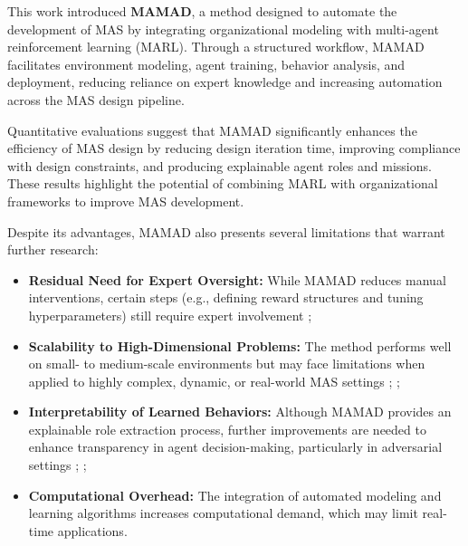 \documentclass[pdflatex,sn-mathphys-num]{sn-jnl}%
\theoremstyle{thmstyleone}%
\theoremstyle{thmstyletwo}%
\theoremstyle{thmstylethree}%
\begin{document}
This work introduced \textbf{MAMAD}, a method designed to automate the development of MAS by integrating organizational modeling with multi-agent reinforcement learning (MARL). Through a structured workflow, MAMAD facilitates environment modeling, agent training, behavior analysis, and deployment, reducing reliance on expert knowledge and increasing automation across the MAS design pipeline. 

Quantitative evaluations suggest that MAMAD significantly enhances the efficiency of MAS design by reducing design iteration time, improving compliance with design constraints, and producing explainable agent roles and missions. These results highlight the potential of combining MARL with organizational frameworks to improve MAS development.


Despite its advantages, MAMAD also presents several limitations that warrant further research:
%
\begin{itemize}
    \item \textbf{Residual Need for Expert Oversight:} While MAMAD reduces manual interventions, certain steps (e.g., defining reward structures and tuning hyperparameters) still require expert involvement ;
    \item \textbf{Scalability to High-Dimensional Problems:} The method performs well on small- to medium-scale environments but may face limitations when applied to highly complex, dynamic, or real-world MAS settings ; ;
    \item \textbf{Interpretability of Learned Behaviors:} Although MAMAD provides an explainable role extraction process, further improvements are needed to enhance transparency in agent decision-making, particularly in adversarial settings ; ;
    \item \textbf{Computational Overhead:} The integration of automated modeling and learning algorithms increases computational demand, which may limit real-time applications.
\end{itemize}
\end{document}
